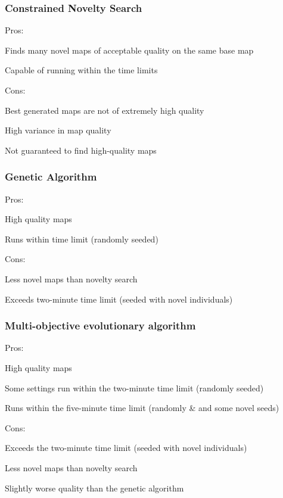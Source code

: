 \subsubsection{Constrained Novelty Search}
Pros:
\begin{my_itemize}
\vspace{-2mm}
\item Finds many novel maps of acceptable quality on the same base map
\item Capable of running within the time limits
\end{my_itemize}
\vspace{-2mm}
Cons:
\begin{my_itemize}
\vspace{-2mm}
\item Best generated maps are not of extremely high quality
\item High variance in map quality
\item Not guaranteed to find high-quality maps
\end{my_itemize}

\subsubsection{Genetic Algorithm}
Pros:
\begin{my_itemize}
\vspace{-2mm}
\item High quality maps
\item Runs within time limit (randomly seeded)
\end{my_itemize}
\vspace{-2mm}
Cons:
\begin{my_itemize}
\vspace{-2mm}
\item Less novel maps than novelty search
\item Exceeds two-minute time limit (seeded with novel individuals)
\end{my_itemize}

\subsubsection{Multi-objective evolutionary algorithm}
Pros:
\begin{my_itemize}
\vspace{-2mm}
\item High quality maps
\item Some settings run within the two-minute time limit (randomly seeded)
\item Runs within the five-minute time limit (randomly \& and some novel seeds)
\end{my_itemize}
\vspace{-2mm}
Cons:
\begin{my_itemize}
\vspace{-2mm}
\item Exceeds the two-minute time limit (seeded with novel individuals)
\item Less novel maps than novelty search
\item Slightly worse quality than the genetic algorithm
\end{my_itemize}